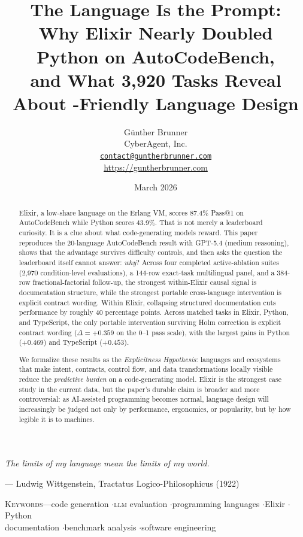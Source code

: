 \documentclass[11pt]{article}
\title{\vspace{-1.1em}\bfseries\LARGE
  The Language Is the Prompt:\\[0.35em]
  \Large Why Elixir Nearly Doubled Python on AutoCodeBench,\\
  and What 3{,}920 Tasks Reveal About \acro{LLM}-Friendly Language Design}
\author{G{\"u}nther Brunner\\
CyberAgent, Inc.\\[0.3em]
\small\texttt{\href{mailto:contact@guntherbrunner.com}{contact@guntherbrunner.com}}\\
\small\url{https://guntherbrunner.com}}
\date{March 2026}
\makeatletter
\newcommand{\acb}{AutoCodeBench}
\newcommand{\passatone}{Pass@1}
\newcommand{\elixir}{Elixir}
\newcommand{\pythonlang}{Python}
\newcommand{\tslang}{TypeScript}
\newcommand{\acro}[1]{\textsc{\MakeLowercase{#1}}}
\makeatother
\begin{document}
\maketitle
\vspace{-1.0em}

\epigraph{\itshape The limits of my language mean the limits of my world.}{--- Ludwig Wittgenstein, \textup{Tractatus Logico-Philosophicus} (1922)}

\vspace{-0.8em}

\begin{abstract}
\elixir{}, a low-share language on the Erlang VM, scores 87.4\% \passatone{} on \acb{} while \pythonlang{} scores 43.9\%. That is not merely a leaderboard curiosity. It is a clue about what code-generating models reward. This paper reproduces the 20-language \acb{} result with GPT-5.4 (medium reasoning), shows that the advantage survives difficulty controls, and then asks the question the leaderboard itself cannot answer: \emph{why}? Across four completed active-ablation suites (2{,}970 condition-level evaluations), a 144-row exact-task multilingual panel, and a 384-row fractional-factorial follow-up, the strongest within-\elixir{} causal signal is documentation structure, while the strongest portable cross-language intervention is explicit contract wording. Within \elixir{}, collapsing structured documentation cuts performance by roughly 40 percentage points. Across matched tasks in \elixir{}, \pythonlang{}, and \tslang{}, the only portable intervention surviving Holm correction is explicit contract wording ($\Delta = +0.359$ on the 0--1 pass scale), with the largest gains in \pythonlang{} ($+0.469$) and \tslang{} ($+0.453$).

We formalize these results as the \emph{Explicitness Hypothesis}: languages and ecosystems that make intent, contracts, control flow, and data transformations locally visible reduce the \emph{predictive burden} on a code-generating model. \elixir{} is the strongest case study in the current data, but the paper's durable claim is broader and more controversial: as AI-assisted programming becomes normal, language design will increasingly be judged not only by performance, ergonomics, or popularity, but by how legible it is to machines.
\end{abstract}

\vspace{0.5em}
{\small\textsc{Keywords}\enspace---\enspace code generation \enspace$\cdot$\enspace \acro{LLM} evaluation \enspace$\cdot$\enspace programming languages \enspace$\cdot$\enspace \elixir{} \enspace$\cdot$\enspace \pythonlang{}\\
documentation \enspace$\cdot$\enspace benchmark analysis \enspace$\cdot$\enspace software engineering}
\end{document}
